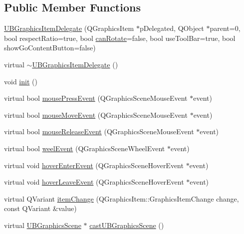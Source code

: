 \subsection*{Public Member Functions}
\begin{DoxyCompactItemize}
\item 
\hyperlink{class_u_b_graphics_item_delegate_a78857ae5335c1a31581a38210d8b2e5e}{U\-B\-Graphics\-Item\-Delegate} (Q\-Graphics\-Item $\ast$p\-Delegated, Q\-Object $\ast$parent=0, bool respect\-Ratio=true, bool \hyperlink{class_u_b_graphics_item_delegate_ad9e31d0b5977088ca59b6ff94c9a9b92}{can\-Rotate}=false, bool use\-Tool\-Bar=true, bool show\-Go\-Content\-Button=false)
\item 
virtual \hyperlink{class_u_b_graphics_item_delegate_a32843fec11e67213a456c8d92377e105}{$\sim$\-U\-B\-Graphics\-Item\-Delegate} ()
\item 
void \hyperlink{class_u_b_graphics_item_delegate_a1de77276aba7276defacd0b87c9b87c7}{init} ()
\item 
virtual bool \hyperlink{class_u_b_graphics_item_delegate_a1e3cda77c7ecc5f3e8863947b0a8f217}{mouse\-Press\-Event} (Q\-Graphics\-Scene\-Mouse\-Event $\ast$event)
\item 
virtual bool \hyperlink{class_u_b_graphics_item_delegate_aa87cd62cebcb17e5233ee5a96e2bf748}{mouse\-Move\-Event} (Q\-Graphics\-Scene\-Mouse\-Event $\ast$event)
\item 
virtual bool \hyperlink{class_u_b_graphics_item_delegate_a76f992490575724a33bc0813f80f7a98}{mouse\-Release\-Event} (Q\-Graphics\-Scene\-Mouse\-Event $\ast$event)
\item 
virtual bool \hyperlink{class_u_b_graphics_item_delegate_a16e86d30f379c41c4f3e30608a0dab74}{weel\-Event} (Q\-Graphics\-Scene\-Wheel\-Event $\ast$event)
\item 
virtual void \hyperlink{class_u_b_graphics_item_delegate_ab0bd076fe5cd5fd9cbe01fdd1a0f0a89}{hover\-Enter\-Event} (Q\-Graphics\-Scene\-Hover\-Event $\ast$event)
\item 
virtual void \hyperlink{class_u_b_graphics_item_delegate_abadc2d8061067eca23931d10ed96b50e}{hover\-Leave\-Event} (Q\-Graphics\-Scene\-Hover\-Event $\ast$event)
\item 
virtual Q\-Variant \hyperlink{class_u_b_graphics_item_delegate_a5851301422e4533173600b1264b852fb}{item\-Change} (Q\-Graphics\-Item\-::\-Graphics\-Item\-Change change, const Q\-Variant \&value)
\item 
virtual \hyperlink{class_u_b_graphics_scene}{U\-B\-Graphics\-Scene} $\ast$ \hyperlink{class_u_b_graphics_item_delegate_ab7e25b6f7905ae98161def55e3cabfe1}{cast\-U\-B\-Graphics\-Scene} ()

\end{DoxyCompactItemize}
